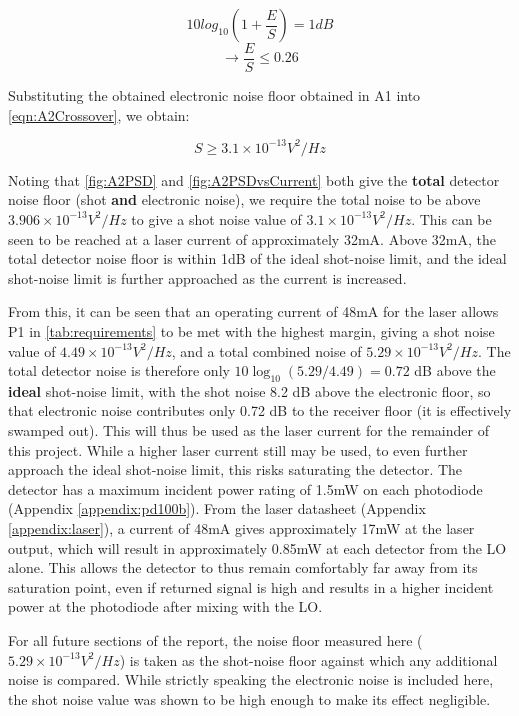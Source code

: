 \begin{equation}
    10log_{10}(1+\frac{E}{S})=1dB
\end{equation}
\begin{equation}
    \xrightarrow{}\frac{E}{S}\leq0.26
    \label{eqn:A2Crossover}
\end{equation}

Substituting the obtained electronic noise floor obtained in A1 into \autoref{eqn:A2Crossover}, we obtain:

\begin{equation}
    S \geq 3.1 \times 10^{-13}V^2/Hz
\end{equation}

Noting that \autoref{fig:A2PSD} and \autoref{fig:A2PSDvsCurrent} both give the \textbf{total} detector noise floor (shot \textbf{and} electronic noise), we require the total noise to be above $3.906 \times 10^{-13}V^2/Hz$ to give a shot noise value of $3.1 \times 10^{-13}V^2/Hz$. This can be seen to be reached at a laser current of approximately 32mA. Above 32mA, the total detector noise floor is within 1dB of the ideal shot-noise limit, and the ideal shot-noise limit is further approached as the current is increased. 

From this, it can be seen that an operating current of 48mA for the laser allows P1 in \autoref{tab:requirements} to be met with the highest margin, giving a shot noise value of $4.49\times 10^{-13}V^2/Hz$, and a total combined noise of $5.29\times 10^{-13}V^2/Hz$. The total detector noise is therefore only $10\log_{10}(5.29/4.49) = 0.72$ dB above
the \textbf{ideal} shot-noise limit, with the shot noise 8.2 dB above the electronic
floor, so that electronic noise contributes only 0.72 dB to the receiver floor (it is effectively swamped out). This will thus be used as the laser current for the remainder of this project. While a higher laser current still may be used, to even further approach the ideal shot-noise limit, this risks saturating the detector. The detector has a maximum incident power rating of 1.5mW on each photodiode (Appendix \ref{appendix:pd100b}). From the laser datasheet (Appendix \ref{appendix:laser}), a current of 48mA gives approximately 17mW at the laser output, which will result in approximately 0.85mW at each detector from the LO alone. This allows the detector to thus remain comfortably far away from its saturation point, even if returned signal is high and results in a higher incident power at the photodiode after mixing with the LO. 

For all future sections of the report, the noise floor measured here ($5.29\times 10^{-13}V^2/Hz$) is taken as the shot-noise floor against which any additional noise is compared. While strictly speaking the electronic noise is included here, the shot noise value was shown to be high enough to make its effect negligible. 


